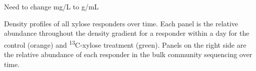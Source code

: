 Need to change mg/L to g/mL

Density profiles of all xylose responders over time. Each panel is the relative abundance throughout the density gradient for a responder within a day for the control (orange) and \textsuperscript{13}C-xylose treatment (green). Panels on the right side are the relative abundance of each responder in the bulk community sequencing over time.  